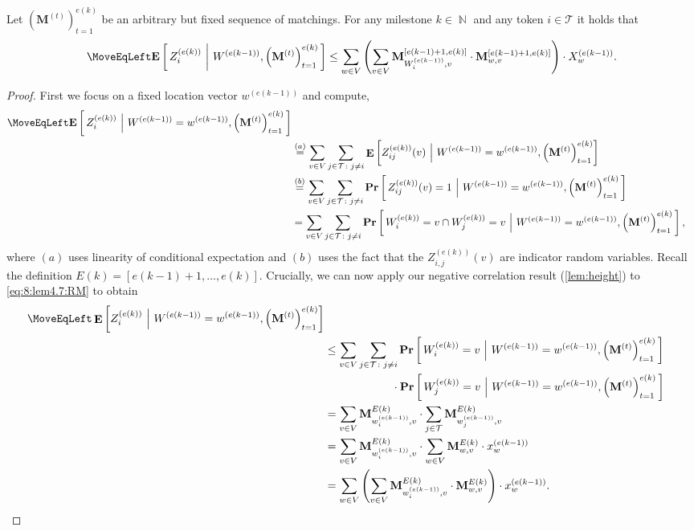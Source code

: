 \documentclass[twoside,leqno]{article}
\DeclareMathOperator{\E}{\mathbf{E}}
\DeclareMathOperator{\N}{\mathbb{N}}
\newcommand{\Pro}[1]{\mathbf{Pr} \left[\,#1\,\right]}
\newcommand{\Ex}[1]{\mathbf{E} \left[\,#1\,\right]}
\newcommand{\Exco}[2]{\mathbf{E} \left[\,#1~\middle\vert~#2\,\right]}
\newcommand{\M}{\mathbf{M}}
\DeclareMathOperator{\1}{\mathbf{1}}
\numberwithin{equation}{section}
\begin{document}
\medskip
\begin{lemma}
\label{lem:collision}
Let $\left(\M^{(t)}\right)_{t=1}^{e(k)}$ be an arbitrary but fixed sequence of matchings.
For any milestone $k \in \N$ and any token $i \in \mathcal{T}$
it holds that
\begin{align*}
\MoveEqLeft
\Exco{ Z_i^{(e(k))}}{W^{(e(k-1))},\left(\M^{(t)}\right)_{t=1}^{e(k)}}
\le
\sum_{w\in V} \left(\sum_{v\in V} \M_{W_i^{(e(k-1))},v}^{[e(k-1)+1,e(k)]}\cdot \M_{w,v}^{[e(k-1)+1,e(k)]}\right) \cdot
X_w^{(e(k-1))}.
\end{align*}
\end{lemma}
\begin{proof}
First we focus on a fixed location vector $w^{(e(k-1))}$ and compute,
\begin{align}
\MoveEqLeft\Ex{Z_i^{(e(k))}~\Big|~ W^{(e(k-1))}= w^{(e(k-1))}, \left(\M^{(t)}\right)_{t=1}^{e(k)} }\notag \\& \stackrel{(a)}{=} \sum_{v \in V} \sum_{j\in \mathcal{T} \colon j \neq i}\E\left[Z_{ij}^{(e(k))}(v)~\Big|~W^{(e(k-1))}= w^{(e(k-1))},\left(\M^{(t)}\right)_{t=1}^{e(k)} \right] \notag \\ &\stackrel{(b)}{=}
\sum_{v \in V} \sum_{j\in \mathcal{T} \colon j \neq i}\Pro{Z_{ij}^{(e(k))}(v) = 1
~\Big|~ W^{(e(k-1))}= w^{(e(k-1))},\left(\M^{(t)}\right)_{t=1}^{e(k)} } \notag \\
&= \sum_{v \in V} \sum_{j\in \mathcal{T} \colon j \neq i} \Pro{W_i^{(e(k))} = v \cap W_j^{(e(k))} = v~\Big|~ W^{(e(k-1))}=w^{(e(k-1))},\left(\M^{(t)}\right)_{t=1}^{e(k)} },\label{eq:8:lem4.7:RM}
\end{align}
where $(a)$ uses linearity of conditional expectation and $(b)$ uses the fact that the $Z_{i,j}^{(e(k))}(v)$ are indicator random variables. Recall the definition $E(k)=[e(k-1)+1,\ldots,e(k)]$. Crucially, we can now apply our negative correlation result (\cref{lem:height}) to \cref{eq:8:lem4.7:RM} to obtain
\begin{align}
\MoveEqLeft \E\left[ Z_i^{(e(k))}~\Big|~ W^{(e(k-1))}= w^{(e(k-1))},\left(\M^{(t)}\right)_{t=1}^{e(k)} \right] \notag \\ &\leq \sum_{v \in V} \sum_{j\in \mathcal{T} \colon j \neq i} \Pro{ W_i^{(e(k))}=v~\Big|~ W^{(e(k-1))}=w^{(e(k-1))},\left(\M^{(t)}\right)_{t=1}^{e(k)} }\notag
\\& \qquad\qquad \qquad \cdot \Pro{W_j^{(e(k))}=v~\Big|~ W^{(e(k-1))}=w^{(e(k-1))},\left(\M^{(t)}\right)_{t=1}^{e(k)} } \notag \\
&= \sum_{v \in V} \M_{w_i^{(e(k-1))},v}^{E(k)} \cdot
\sum_{j\in \mathcal{T}} \M_{w_j^{(e(k-1))},v}^{E(k)} \notag \\
&=
\sum_{v \in V} \M_{w_i^{(e(k-1))},v}^{E(k)} \cdot \sum_{w \in V} \M_{w,v}^{E(k)} \cdot
x_w^{(e(k-1))}
\notag \\
&=
\sum_{w\in V} \left(\sum_{v\in V} \M_{w_i^{(e(k-1))},v}^{E(k)}\cdot \M_{w,v}^{E(k)}\right) \cdot x_w^{(e(k-1))}.\notag
\end{align}


\end{proof}
\end{document}
